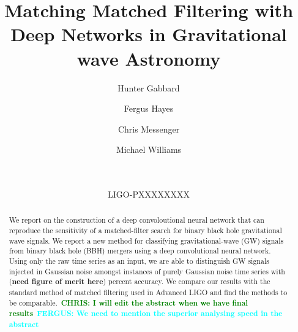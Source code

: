 \documentclass[%
showpacs,
 amsmath,amssymb,
 aps,
 twocolumn,
 prl,
 reprint,
floatfix,
]{revtex4-1}
\newcommand{\dcc}{LIGO-PXXXXXXXX}
\newcommand{\chris}[1]{\textbf{\textcolor{green}{CHRIS: #1}}}
\newcommand{\fergus}[1]{\textbf{\textcolor{cyan}{FERGUS: #1}}}
\begin{document}

%
%
\title{Matching Matched Filtering with Deep Networks in Gravitational wave Astronomy}

\author{Hunter Gabbard}
\author{Fergus Hayes}
\author{Chris Messenger}
\author{Michael Williams}


\date{\commitDATE\\\mbox{\small \commitID}\\\mbox{\dcc}}

%
%
\begin{abstract} 
%
We report on the construction of a deep convoloutional neural network that can
reproduce the sensitivity of a matched-filter search for binary black hole
gravitational wave signals. We report a new method for classifying
gravitational-wave (GW) signals from binary black hole (BBH) mergers using a
deep convolutional neural network. Using only the raw time series as an input,
we are able to distinguish GW signals injected in Gaussian noise amongst
instances of purely Gaussian noise time series with (\textbf{need figure of
merit here}) percent accuracy.  We compare our results with the standard method
of matched filtering used in Advanced LIGO and find the methods to be
comparable.~\chris{I will edit the abstract when we have final results}~\fergus{We need to mention the superior analysing speed in the abstract}
%
\end{abstract}



\end{document}
